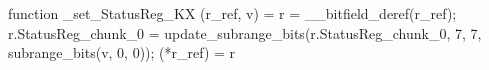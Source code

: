 function _set_StatusReg_KX (r_ref, v) = {
    r = __bitfield_deref(r_ref);
    r.StatusReg_chunk_0 = update_subrange_bits(r.StatusReg_chunk_0, 7, 7, subrange_bits(v, 0, 0));
    (*r_ref) = r
}
